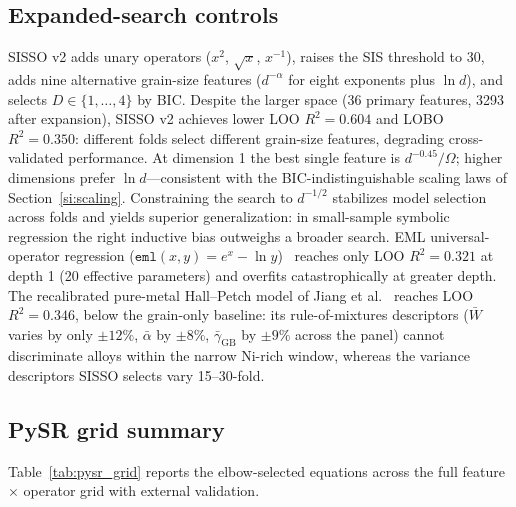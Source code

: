 \documentclass[11pt]{article}
\begin{document}
\subsection{Expanded-search controls}
SISSO v2 adds unary operators ($x^2$, $\sqrt{x}$, $x^{-1}$), raises the SIS threshold to 30, adds nine alternative grain-size features ($d^{-\alpha}$ for eight exponents plus $\ln d$), and selects $D \in \{1,\ldots,4\}$ by BIC. Despite the larger space (36 primary features, 3293 after expansion), SISSO v2 achieves lower LOO $R^2 = 0.604$ and LOBO $R^2 = 0.350$: different folds select different grain-size features, degrading cross-validated performance. At dimension 1 the best single feature is $d^{-0.45}/\Omega$; higher dimensions prefer $\ln d$---consistent with the BIC-indistinguishable scaling laws of Section~\ref{si:scaling}. Constraining the search to $d^{-1/2}$ stabilizes model selection across folds and yields superior generalization: in small-sample symbolic regression the right inductive bias outweighs a broader search. EML universal-operator regression ($\texttt{eml}(x,y) = e^x - \ln y$)~\cite{Odrzywolek2025} reaches only LOO $R^2 = 0.321$ at depth 1 (20 effective parameters) and overfits catastrophically at greater depth. The recalibrated pure-metal Hall--Petch model of Jiang et al.~\cite{Jiang2022HP} reaches LOO $R^2 = 0.346$, below the grain-only baseline: its rule-of-mixtures descriptors ($\bar{W}$ varies by only $\pm 12\%$, $\bar{\alpha}$ by $\pm 8\%$, $\bar{\gamma}_\text{GB}$ by $\pm 9\%$ across the panel) cannot discriminate alloys within the narrow Ni-rich window, whereas the variance descriptors SISSO selects vary 15--30-fold.

\subsection{PySR grid summary}
Table~\ref{tab:pysr_grid} reports the elbow-selected equations across the full feature $\times$ operator grid with external validation.
\end{document}

